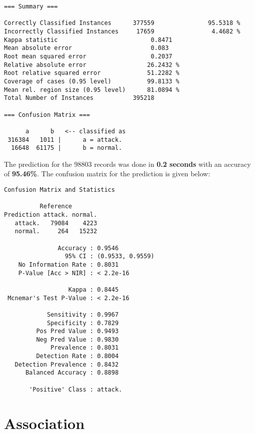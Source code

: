 \documentclass[11pt]{article}
\begin{document}
\begin{Verbatim}[fontsize=\small]
=== Summary ===

Correctly Classified Instances      377559               95.5318 %
Incorrectly Classified Instances     17659                4.4682 %
Kappa statistic                          0.8471
Mean absolute error                      0.083 
Root mean squared error                  0.2037
Relative absolute error                 26.2432 %
Root relative squared error             51.2282 %
Coverage of cases (0.95 level)          99.8133 %
Mean rel. region size (0.95 level)      81.0894 %
Total Number of Instances           395218     

=== Confusion Matrix ===

      a      b   <-- classified as
 316384   1011 |      a = attack.
  16648  61175 |      b = normal.
\end{Verbatim}

The prediction for the 98803 records was done in {\bf 0.2 seconds} with an accuracy of {\bf 95.46\%}. The confusion matrix for the prediction is given below:

\begin{Verbatim}[fontsize=\small]
Confusion Matrix and Statistics

          Reference
Prediction attack. normal.
   attack.   79084    4223
   normal.     264   15232
                                          
               Accuracy : 0.9546          
                 95% CI : (0.9533, 0.9559)
    No Information Rate : 0.8031          
    P-Value [Acc > NIR] : < 2.2e-16       
                                          
                  Kappa : 0.8445          
 Mcnemar's Test P-Value : < 2.2e-16       
                                          
            Sensitivity : 0.9967          
            Specificity : 0.7829          
         Pos Pred Value : 0.9493          
         Neg Pred Value : 0.9830          
             Prevalence : 0.8031          
         Detection Rate : 0.8004          
   Detection Prevalence : 0.8432          
      Balanced Accuracy : 0.8898          
                                          
       'Positive' Class : attack.  
\end{Verbatim}      

\section{Association}
\end{document}
